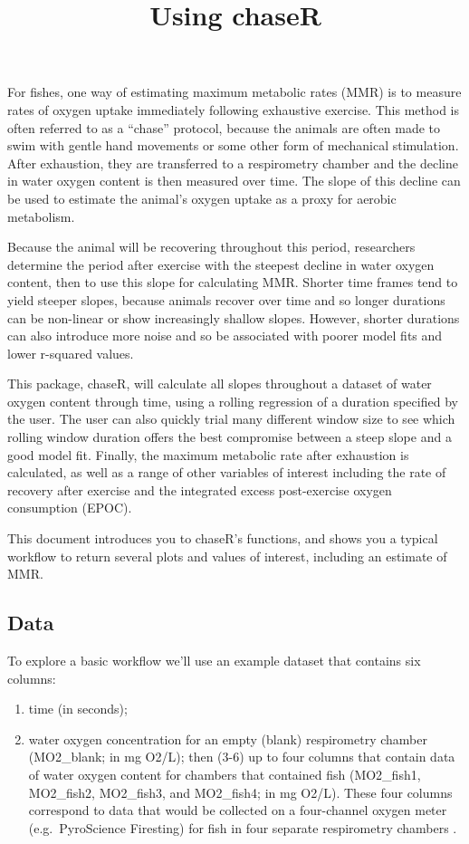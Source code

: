 \documentclass[
]{article}
\title{Using chaseR}
\author{}
\date{\vspace{-2.5em}}
\providecommand{\tightlist}{%
  \setlength{\itemsep}{0pt}\setlength{\parskip}{0pt}}
\begin{document}
\maketitle

For fishes, one way of estimating maximum metabolic rates (MMR) is to
measure rates of oxygen uptake immediately following exhaustive
exercise. This method is often referred to as a ``chase'' protocol,
because the animals are often made to swim with gentle hand movements or
some other form of mechanical stimulation. After exhaustion, they are
transferred to a respirometry chamber and the decline in water oxygen
content is then measured over time. The slope of this decline can be
used to estimate the animal's oxygen uptake as a proxy for aerobic
metabolism.

Because the animal will be recovering throughout this period,
researchers determine the period after exercise with the steepest
decline in water oxygen content, then to use this slope for calculating
MMR. Shorter time frames tend to yield steeper slopes, because animals
recover over time and so longer durations can be non-linear or show
increasingly shallow slopes. However, shorter durations can also
introduce more noise and so be associated with poorer model fits and
lower r-squared values.

This package, chaseR, will calculate all slopes throughout a dataset of
water oxygen content through time, using a rolling regression of a
duration specified by the user. The user can also quickly trial many
different window size to see which rolling window duration offers the
best compromise between a steep slope and a good model fit. Finally, the
maximum metabolic rate after exhaustion is calculated, as well as a
range of other variables of interest including the rate of recovery
after exercise and the integrated excess post-exercise oxygen
consumption (EPOC).

This document introduces you to chaseR's functions, and shows you a
typical workflow to return several plots and values of interest,
including an estimate of MMR.

\subsection{Data}\label{data}

To explore a basic workflow we'll use an example dataset that contains
six columns:

\begin{enumerate}
\def\labelenumi{(\arabic{enumi})}
\tightlist
\item
  time (in seconds);
\item
  water oxygen concentration for an empty (blank) respirometry chamber
  (MO2\_blank; in mg O2/L); then (3-6) up to four columns that contain
  data of water oxygen content for chambers that contained fish
  (MO2\_fish1, MO2\_fish2, MO2\_fish3, and MO2\_fish4; in mg O2/L).
  These four columns correspond to data that would be collected on a
  four-channel oxygen meter (e.g.~PyroScience Firesting) for fish in
  four separate respirometry chambers .
\end{enumerate}
\end{document}
